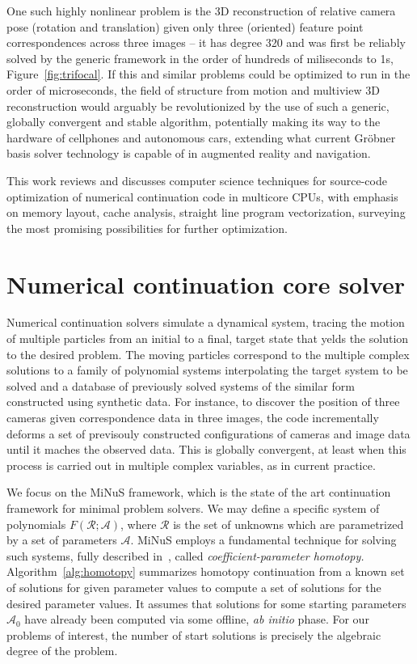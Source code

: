\documentclass[10pt,conference]{IEEEtran}
\begin{document}
One such highly nonlinear problem is the 3D reconstruction of relative camera
pose (rotation and translation) given only three (oriented) feature point
correspondences across three images -- it has degree 320 and was first be
reliably solved by the generic framework in the order of hundreds of miliseconds
to 1s, Figure~\ref{fig:trifocal}. If this and similar problems could be
optimized to run in the order of microseconds, the field of structure from
motion and multiview 3D reconstruction would arguably be revolutionized by the
use of such a generic, globally convergent and stable algorithm, potentially
making its way to the hardware of cellphones and autonomous cars, extending what
current Gr\"obner basis solver technology is capable of in augmented reality and
navigation.

This work reviews and discusses computer science techniques for source-code
optimization of numerical continuation code in multicore CPUs, with emphasis on
memory layout, cache analysis, straight line program vectorization, surveying
the most promising possibilities for further optimization. 

\section{Numerical continuation core solver}

Numerical continuation solvers simulate a dynamical system, tracing the motion
of multiple particles from an initial to a final, target state that yelds the
solution to the desired problem. The moving particles correspond to the multiple
complex solutions to a family of polynomial systems interpolating the target
system to be solved and a database of previously solved systems of the similar
form constructed using synthetic data. For instance, to discover the position of
three cameras given correspondence data in three images, the code incrementally
deforms a set of previsouly constructed configurations of cameras and image data
until it maches the observed data. This is globally convergent, at least when
this process is carried out in multiple complex variables, as in current
practice.

We focus on the MiNuS framework, which is the state of the art continuation
framework for minimal problem solvers. We may define a specific system of
polynomials $F(\mathcal{R};\mathcal{A})$, where $\mathcal R$ is the set of
unknowns which are parametrized by a set of parameters $\mathcal A$.
MiNuS employs a fundamental technique for solving such systems, fully described
in~\cite{SWbook}, called \emph{coefficient-parameter homotopy.}
Algorithm~\ref{alg:homotopy} summarizes homotopy continuation from a known set
of solutions for given parameter values to compute a set of solutions for the
desired parameter values. It assumes that solutions for some starting parameters
$\mathcal{A}_0$ have already been computed via some offline, \emph{ab initio}
phase. For our problems of interest, the number of start solutions is precisely
the algebraic degree of the problem. 
\end{document}
